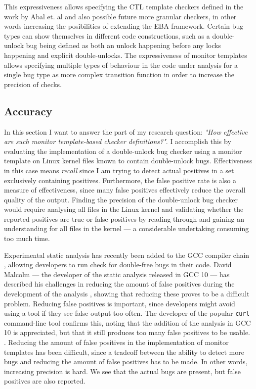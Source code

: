 \newpar This expressiveness allows specifying the CTL template checkers defined in the work by Abal et. al and also possible future more granular checkers, in other words increasing the posibilities of extending the EBA framework. Certain bug types can show themselves in different code constructions, such as a double-unlock bug being defined as both an unlock happening before any locks happening and explicit double-unlocks. The expressiveness of monitor templates allows specifying multiple types of behaviour in the code under analysis for a single bug type as more complex transition function in order to increase the precision of checks.

\subsection{Accuracy}

In this section I want to answer the part of my research question: \textit{"How effective are such monitor template-based checker definitions?"}. I accomplish this by evaluating the implementation of a double-unlock bug checker using a monitor template on Linux kernel files known to contain double-unlock bugs. Effectiveness in this case means \textit{recall} since I am trying to detect actual positives in a set exclusively containing positives. Furthermore, the false positive rate is also a measure of effectiveness, since many false positives effectively reduce the overall quality of the output. Finding the precision of the double-unlock bug checker would require analysing all files in the Linux kernel and validating whether the reported positives are true or false positives by reading through and gaining an understanding for all files in the kernel --- a considerable undertaking consuming too much time.

Experimental static analysis has recently been added to the GCC compiler chain \cite{gcc10}, allowing developers to run check for double-free bugs in their code. David Malcolm --- the developer of the static analysis released in GCC 10 --- has described his challenges in reducing the amount of false positives during the development of the analysis \cite{gcc10-development}, showing that reducing these proves to be a difficult problem. Reducing false positives is important, since developers might avoid using a tool if they see false output too often. The developer of the popular \texttt{curl} command-line tool confirms this, noting that the addition of the analysis in GCC 10 is appreciated, but that it still produces too many false positives to be usable. \cite{curl-static-analysis}. Reducing the amount of false positives in the implementation of monitor templates has been difficult, since a tradeoff between the ability to detect more bugs and reducing the amount of false positives has to be made. In other words, increasing precision is hard. We see that the actual bugs are present, but false positives are also reported. 

